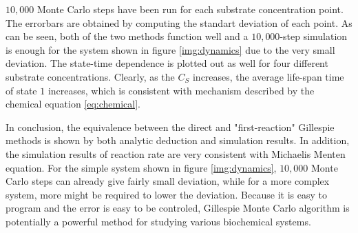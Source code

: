 	$10,000$ Monte Carlo steps have been run for each substrate concentration point. The errorbars are obtained by computing the standart deviation of each point. As can be seen, both of the two methods function well and a $10,000$-step simulation is enough for the system shown in figure \ref{img:dynamics} due to the very small deviation. The state-time dependence is plotted out as well for four different substrate concentrations. Clearly, as the $C_S$ increases, the average life-span time of state $1$ increases, which is consistent with mechanism described by the chemical equation \eqref{eq:chemical}.

	In conclusion, the equivalence between the direct and "first-reaction" Gillespie methods is shown by both analytic deduction and simulation results. In addition, the simulation results of reaction rate are very consistent with Michaelis Menten equation. For the simple system shown in figure \ref{img:dynamics}, $10,000$ Monte Carlo steps can already give fairly small deviation, while for a more complex system, more might be required to lower the deviation. Because it is easy to program and the error is easy to be controled, Gillespie Monte Carlo algorithm is potentially a powerful method for studying various biochemical systems.






